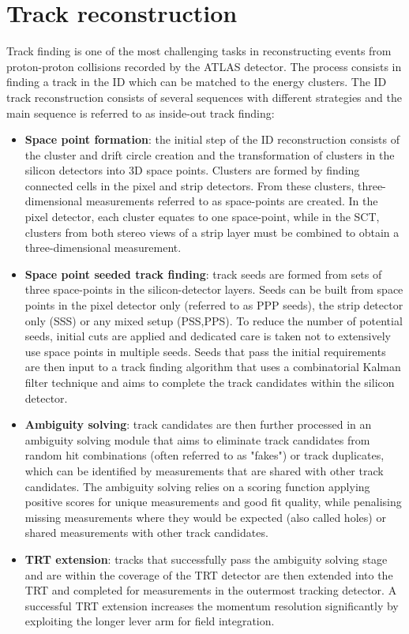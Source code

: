 \documentclass[a4paper, oneside]{book}
\begin{document}
		\section{Track reconstruction}
		Track finding is one of the most challenging tasks in reconstructing events from proton-proton  collisions  recorded  by  the  ATLAS  detector. The process consists in finding a track in the ID which can be matched to the energy clusters. The ID track reconstruction consists of several sequences with different strategies and the main sequence is referred to as inside-out track finding: \cite{ID reco alg}
		\begin{itemize}
			\item \textbf{Space point formation}: the initial step of the ID reconstruction consists of the cluster and drift circle creation and the transformation of clusters in the silicon detectors into 3D space points. Clusters are formed by finding connected cells in
			the pixel and strip detectors. \cite{Track reco}From these clusters, three-dimensional measurements referred to as space-points are created. In the pixel detector, each cluster equates to one space-point, while in the SCT, clusters from both stereo views of a strip layer must be combined to obtain a three-dimensional measurement. 
			
			\item \textbf{Space point seeded track finding}: track seeds are formed from sets of three space-points in the silicon-detector layers. \cite{ID reco alg} Seeds can be built from space points in the pixel detector only (referred to as PPP seeds), the strip detector only (SSS) or any mixed setup (PSS,PPS). To reduce the number of potential seeds, initial cuts are applied and dedicated care is taken not to
			extensively use space points in multiple seeds. Seeds that pass the initial requirements are then input to a track finding algorithm that uses a combinatorial Kalman filter technique and aims to complete the track candidates within the silicon detector.
			
			\item \textbf{Ambiguity solving}: track candidates are then further processed in an ambiguity solving
			module that aims to eliminate track candidates from random hit combinations (often
			referred to as "fakes") or track duplicates, which can be identified by measurements that are shared with other track candidates. The ambiguity solving relies on a scoring function applying positive scores for unique measurements and good fit quality, while penalising missing measurements where they would be expected (also called holes) or shared measurements with other track candidates.
			
			\item \textbf{TRT extension}: tracks that successfully pass the ambiguity solving stage and are within the coverage of the TRT detector are then extended into the TRT and completed for measurements in the outermost tracking detector. A successful TRT extension increases the
			momentum resolution significantly by exploiting the longer lever arm for field integration.
		\end{itemize}
		
\end{document}
